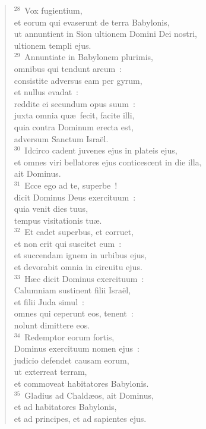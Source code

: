 \begin{verse}
${}^{28}$~Vox fugientium,\\ et eorum qui evaserunt de terra Babylonis,\\ ut annuntient in Sion ultionem Domini Dei nostri,\\ ultionem templi ejus.\\
${}^{29}$~Annuntiate in Babylonem plurimis,\\ omnibus qui tendunt arcum~:\\ consistite adversus eam per gyrum,\\ et nullus evadat~:\\ reddite ei secundum opus suum~:\\ juxta omnia qu\ae\ fecit, facite illi,\\ quia contra Dominum erecta est,\\ adversum Sanctum Isra\"el.\\
${}^{30}$~Idcirco cadent juvenes ejus in plateis ejus,\\ et omnes viri bellatores ejus conticescent in die illa,\\ ait Dominus.\\
${}^{31}$~Ecce ego ad te, superbe~!\\ dicit Dominus Deus exercituum~:\\ quia venit dies tuus,\\ tempus visitationis tu\ae .\\
${}^{32}$~Et cadet superbus, et corruet,\\ et non erit qui suscitet eum~:\\ et succendam ignem in urbibus ejus,\\ et devorabit omnia in circuitu ejus.\\
${}^{33}$~H\ae c dicit Dominus exercituum~:\\ Calumniam sustinent filii Isra\"el,\\ et filii Juda simul~:\\ omnes qui ceperunt eos, tenent~:\\ nolunt dimittere eos.\\
${}^{34}$~Redemptor eorum fortis,\\ Dominus exercituum nomen ejus~:\\ judicio defendet causam eorum,\\ ut exterreat terram,\\ et commoveat habitatores Babylonis.\\
${}^{35}$~Gladius ad Chald\ae os, ait Dominus,\\ et ad habitatores Babylonis,\\ et ad principes, et ad sapientes ejus.\\

\end{verse}
